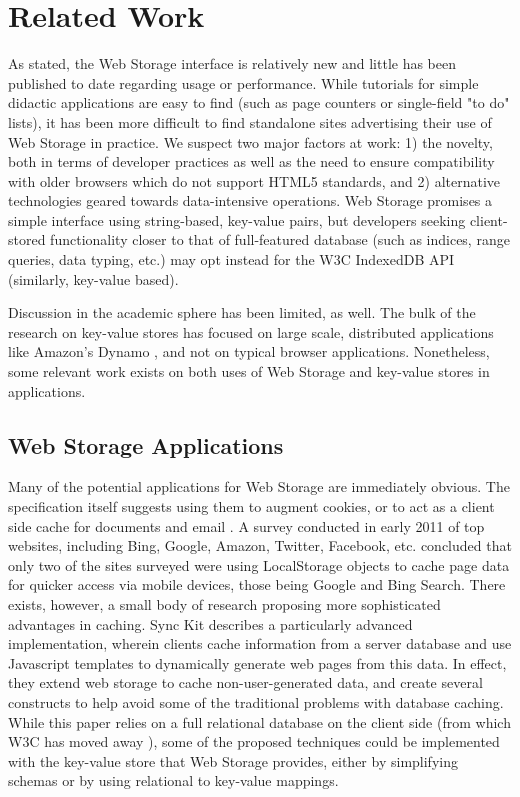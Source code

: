 \section{Related Work}
\label{section:related_work}

As stated, the Web Storage interface is relatively new and little has been published to date regarding usage or performance.  While tutorials for simple didactic applications are easy to find (such as page counters or single-field "to do" lists), it has been more difficult to find standalone sites advertising their use of Web Storage in practice.  We suspect two major factors at work: 1) the novelty, both in terms of developer practices as well as the need to ensure compatibility with older browsers which do not support HTML5 standards, and 2) alternative technologies geared towards data-intensive operations.  Web Storage promises a simple interface using string-based, key-value pairs, but developers seeking client-stored functionality closer to that of full-featured database (such as indices, range queries, data typing, etc.) may opt instead for the W3C IndexedDB API (similarly, key-value based).  

Discussion in the academic sphere has been limited, as well.  The bulk of the research on key-value stores has focused on large scale, distributed applications like Amazon’s Dynamo \cite{amazon:dynamo}, and not on typical browser applications. Nonetheless, some relevant work exists on both uses of Web Storage and key-value stores in applications.

\subsection{Web Storage Applications}
\label{subsection:web_storage}
Many of the potential applications for Web Storage are immediately obvious. The specification itself suggests using them to augment cookies, or to act as a client side cache for documents and email \cite{w3c:webstorage}.  A survey conducted in early 2011 of top websites, including Bing, Google, Amazon, Twitter, Facebook, etc. concluded that only two of the sites surveyed were using LocalStorage objects to cache page data for quicker access via mobile devices, those being Google and Bing Search. \cite{case:bing_google}   There exists, however, a small body of research proposing more sophisticated advantages in caching.  Sync Kit \cite{benson:sync_kit} describes a particularly advanced implementation, wherein clients cache information from a server database and use Javascript templates to dynamically generate web pages from this data.  In effect, they extend web storage to cache non-user-generated data, and create several constructs to help avoid some of the traditional problems with database caching. While this paper relies on a full relational database on the client side (from which W3C has moved away \cite{w3c:websql}), some of the proposed techniques could be implemented with the key-value store that Web Storage provides, either by simplifying schemas or by using relational to key-value mappings.
 
